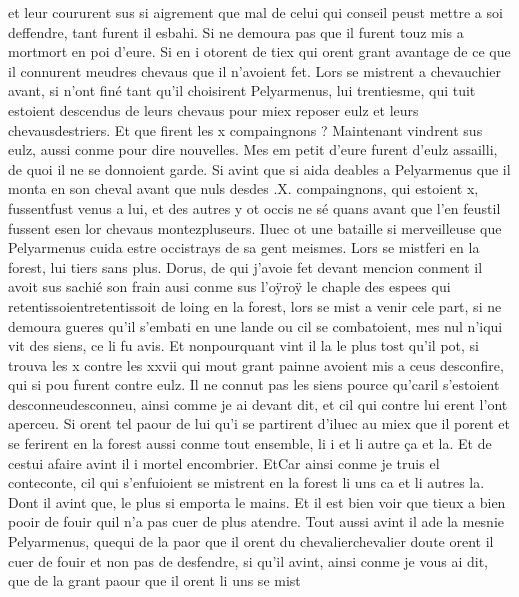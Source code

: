 \documentclass{article}
\begin{document}
\begin{pages}
   et leur coururent sus si aigrement que mal de celui qui conseil peust mettre a soi deffendre, tant furent il esbahi. 
   Si ne demoura pas que il furent touz mis a mortmort en poi d'eure. Si en i 
   otorent de tiex 
   qui orent grant avantage de ce que il connurent meudres chevaus que il n’avoient 
   fet. Lors se mistrent a chevauchier avant, si n’ont finé tant qu’il choisirent 
   Pelyarmenus, lui trentiesme, qui tuit estoient descendus de leurs chevaus pour miex reposer eulz 
   et leurs chevausdestriers. Et que firent les x compaingnons ? 
   Maintenant vindrent sus eulz, aussi conme pour dire nouvelles. 
   Mes em petit d’eure furent d’eulz assailli, de quoi il ne se donnoient garde. 
   Si avint que si aida deables a Pelyarmenus que il monta en son cheval avant 
   que nuls desdes .X. compaingnons, 
   qui estoient x, 
   fussentfust venus a 
   lui, et des autres y ot occis ne sé quans avant que 
      l’en feustil fussent 
      esen lor chevaus montezpluseurs. 
   Iluec ot une bataille si merveilleuse que Pelyarmenus cuida estre 
   occistrays de sa gent meismes. Lors se 
   mistferi en la forest, lui tiers 
   sans plus. \pend
\pstart Dorus, de qui j’avoie fet devant mencion conment 
   il avoit sus sachié son frain ausi conme sus l’oÿroÿ le chaple 
   des espees qui 
   retentissoientretentissoit de loing en la forest, 
   lors se mist a venir cele part, si ne demoura gueres qu’il s’embati en une lande ou cil se combatoient, mes nul 
   n'iqui vit des siens, 
   ce li fu avis. Et nonpourquant vint il la le plus tost qu’il pot, si trouva les x contre les xxvii 
   qui mout grant painne avoient mis a ceus desconfire, qui si pou furent contre eulz. Il ne connut pas les siens 
   pource qu’caril s’estoient desconneudesconneu, ainsi comme je ai devant dit, 
   et cil qui contre lui erent l’ont aperceu. Si orent tel paour de lui qu’i se partirent d’iluec au miex 
   que il porent et se ferirent en la forest aussi conme tout ensemble, li i et li autre ça et la. 
   Et de cestui afaire avint il i mortel encombrier. 
   EtCar ainsi conme je truis el 
      conteconte, cil qui s'enfuioient se mistrent en la forest li uns ca 
      et li autres la. Dont il avint que, le plus si emporta le mains. Et il est bien voir que tieux a bien pooir de 
   fouir quil n’a pas cuer de plus atendre. 
   Tout aussi avint il ade la mesnie 
   Pelyarmenus, quequi de la paor que 
   il orent du chevalierchevalier doute orent 
   il cuer de fouir et non pas de desfendre, si qu’il avint, 
   ainsi conme je vous ai dit, que de la grant paour que il orent li uns se mist 

\end{pages}
\end{document}
